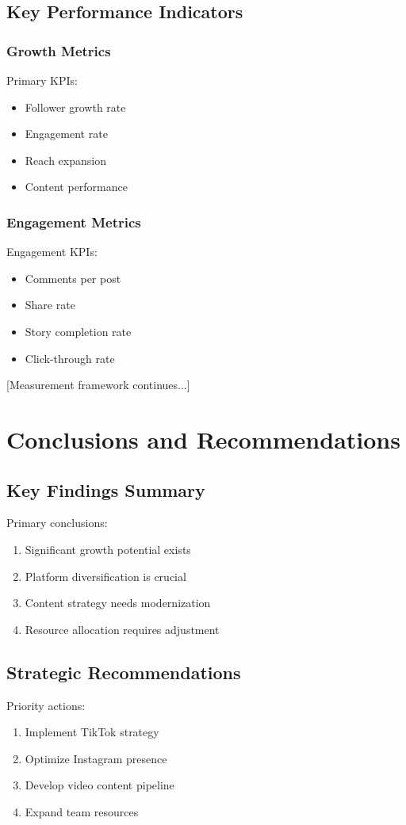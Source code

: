 \documentclass[12pt]{report}
\begin{document}
\section{Key Performance Indicators}
\subsection{Growth Metrics}
Primary KPIs:
\begin{itemize}
    \item Follower growth rate
    \item Engagement rate
    \item Reach expansion
    \item Content performance
\end{itemize}

\subsection{Engagement Metrics}
Engagement KPIs:
\begin{itemize}
    \item Comments per post
    \item Share rate
    \item Story completion rate
    \item Click-through rate
\end{itemize}

[Measurement framework continues...]

\chapter{Conclusions and Recommendations}

\section{Key Findings Summary}
Primary conclusions:
\begin{enumerate}
    \item Significant growth potential exists
    \item Platform diversification is crucial
    \item Content strategy needs modernization
    \item Resource allocation requires adjustment
\end{enumerate}

\section{Strategic Recommendations}
Priority actions:
\begin{enumerate}
    \item Implement TikTok strategy
    \item Optimize Instagram presence
    \item Develop video content pipeline
    \item Expand team resources
\end{enumerate}
\end{document}
